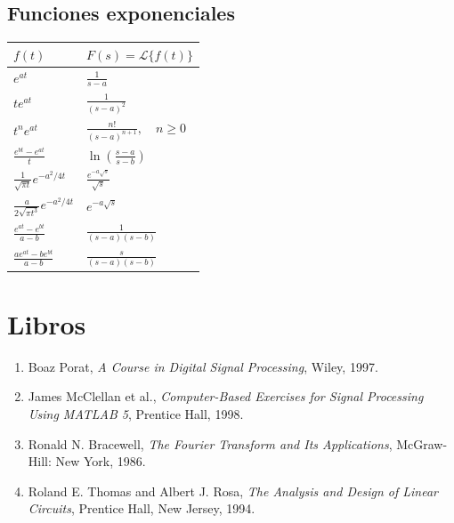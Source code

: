\documentclass[11pt,a4paper,openany]{book}
\begin{document}
\subsection{Funciones exponenciales}

\begin{center}
	\renewcommand{\arraystretch}{1.8}
	\begin{tabular}{ll}
		\textbf{$f(t)$} & \textbf{$F(s) = \mathcal{L}\{f(t)\}$} \\ \hline
		$e^{at}$ & $\frac{1}{s-a}$ \\ 
		$t e^{at}$ & $\frac{1}{(s-a)^{2}}$ \\ 
		$t^n e^{at}$ & $\frac{n!}{(s-a)^{n+1}}, \quad n\geq 0$ \\ 
		$\frac{e^{bt}-e^{at}}{t}$ & $\ln \left( \frac{s-a}{s-b} \right)$ \\
		$\frac{1}{\sqrt{\pi t}}e^{-a^{2}/4t}$ & $\frac{e^{-a\sqrt{s}}}{\sqrt{s}}$ \\ 
		$\frac{a}{2\sqrt{\pi t^{3}}}e^{-a^{2}/4t}$ & $e^{-a\sqrt{s}}$ \\ 
		$\frac{e^{at}-e^{bt}}{a-b}$ & $\frac{1}{(s-a)(s-b)}$ \\ 
		$\frac{ae^{at}-be^{bt}}{a-b}$ & $\frac{s}{(s-a)(s-b)}$
	\end{tabular}
\end{center}


\section{Libros}
\begin{enumerate}
	
	\item Boaz Porat, 
	\textit{A Course in Digital Signal Processing}, 
	Wiley, 1997. 
	
	\item James McClellan et al., 
	\textit{Computer-Based Exercises for Signal Processing Using MATLAB 5},
	Prentice Hall, 1998.
	
	\item Ronald N. Bracewell, 
	\textit{The Fourier Transform and Its Applications},
	McGraw-Hill: New York, 1986.
	
	\item Roland E. Thomas and Albert J. Rosa, 
	\textit{The Analysis and Design of Linear Circuits},
	Prentice Hall, New Jersey, 1994.
	
\end{enumerate}

\end{document}
